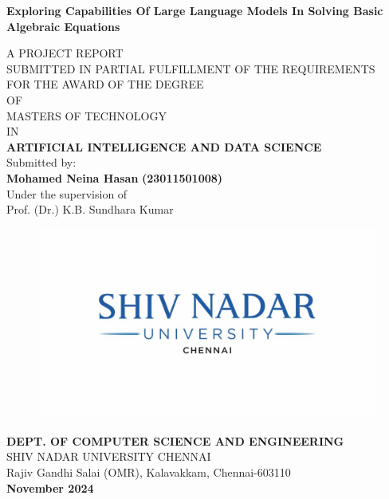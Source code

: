 \documentclass[12pt,a4paper]{report}
\begin{document}
\begin{center}
{\Large \textbf{Exploring Capabilities Of Large Language Models In Solving Basic Algebraic Equations}}\\
\vspace{0.5cm}

A PROJECT REPORT\\
SUBMITTED IN PARTIAL FULFILLMENT OF THE REQUIREMENTS\\
FOR THE AWARD OF THE DEGREE\\
OF\\
MASTERS OF TECHNOLOGY \\
IN\\
\textbf{ARTIFICIAL INTELLIGENCE AND DATA SCIENCE} \\
\vspace{1 cm}
Submitted by: \\

\textbf{Mohamed Neina Hasan}
\textbf{(23011501008)}\\

\vspace{1 cm}
Under the supervision of\\

Prof. (Dr.) K.B. Sundhara Kumar\\


\end{center}

\begin{center}
\begin{figure}[H]
    \centering
    \includegraphics[scale=0.8]{SNU-chennai-LOGO-1024x576.jpg}
    \label{fig:SNUC logo}
\end{figure}

\textbf{DEPT. OF COMPUTER SCIENCE AND ENGINEERING}\\
SHIV NADAR UNIVERSITY CHENNAI\\
Rajiv Gandhi Salai (OMR), Kalavakkam, Chennai-603110 \\
\textbf{November 2024}\\
\end{center}
\end{document}
